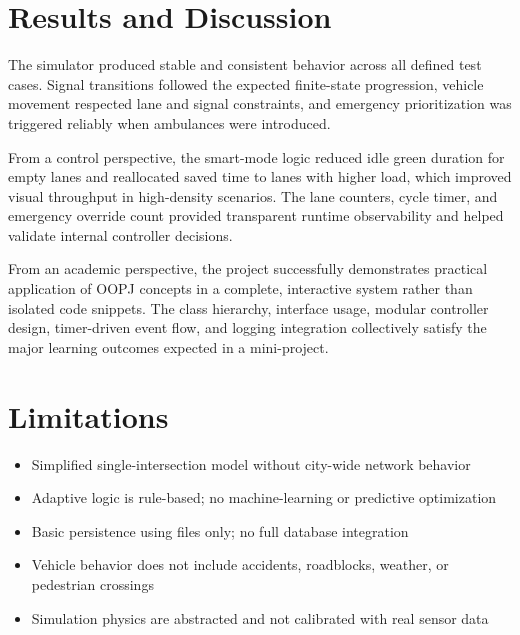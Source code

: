 \documentclass[12pt,a4paper]{article}
\begin{document}
\section{Results and Discussion}
The simulator produced stable and consistent behavior across all defined test cases. Signal transitions followed the expected finite-state progression, vehicle movement respected lane and signal constraints, and emergency prioritization was triggered reliably when ambulances were introduced.

From a control perspective, the smart-mode logic reduced idle green duration for empty lanes and reallocated saved time to lanes with higher load, which improved visual throughput in high-density scenarios. The lane counters, cycle timer, and emergency override count provided transparent runtime observability and helped validate internal controller decisions.

From an academic perspective, the project successfully demonstrates practical application of OOPJ concepts in a complete, interactive system rather than isolated code snippets. The class hierarchy, interface usage, modular controller design, timer-driven event flow, and logging integration collectively satisfy the major learning outcomes expected in a mini-project.

\section{Limitations}
\begin{itemize}
    \item Simplified single-intersection model without city-wide network behavior
    \item Adaptive logic is rule-based; no machine-learning or predictive optimization
    \item Basic persistence using files only; no full database integration
    \item Vehicle behavior does not include accidents, roadblocks, weather, or pedestrian crossings
    \item Simulation physics are abstracted and not calibrated with real sensor data
\end{itemize}
\end{document}
